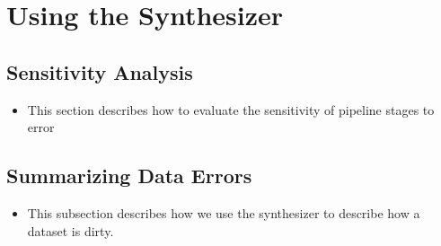 \section{Using the Synthesizer}

\subsection{Sensitivity Analysis}

\begin{itemize}
    \item This section describes how to evaluate the sensitivity of pipeline stages to error
\end{itemize}

\subsection{Summarizing Data Errors}

\begin{itemize}
    \item This subsection describes how we use the synthesizer to describe how a dataset is dirty.
\end{itemize}


